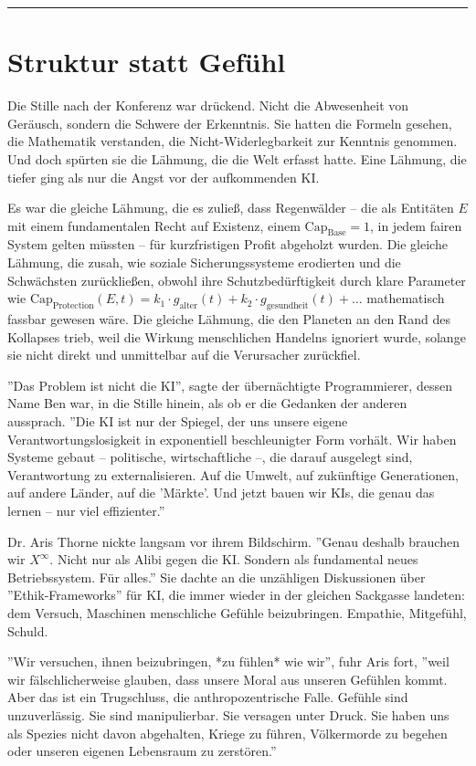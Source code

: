 \documentclass[12pt, ngerman, parskip=full]{scrartcl} %
\begin{document}
\noindent\rule{\linewidth}{0.4pt}



\section{Struktur statt Gefühl}
Die Stille nach der Konferenz war drückend. Nicht die Abwesenheit von Geräusch, sondern die Schwere der Erkenntnis. Sie hatten die Formeln gesehen, die Mathematik verstanden, die Nicht-Widerlegbarkeit zur Kenntnis genommen. Und doch spürten sie die Lähmung, die die Welt erfasst hatte. Eine Lähmung, die tiefer ging als nur die Angst vor der aufkommenden KI.

Es war die gleiche Lähmung, die es zuließ, dass Regenwälder – die als Entitäten $E$ mit einem fundamentalen Recht auf Existenz, einem $\text{Cap}_{\text{Base}} = 1$, in jedem fairen System gelten müssten – für kurzfristigen Profit abgeholzt wurden. Die gleiche Lähmung, die zusah, wie soziale Sicherungssysteme erodierten und die Schwächsten zurückließen, obwohl ihre Schutzbedürftigkeit durch klare Parameter wie $\text{Cap}_{\text{Protection}}(E, t) = k_1 \cdot g_{\text{alter}}(t) + k_2 \cdot g_{\text{gesundheit}}(t) + \dots$ mathematisch fassbar gewesen wäre. Die gleiche Lähmung, die den Planeten an den Rand des Kollapses trieb, weil die Wirkung menschlichen Handelns ignoriert wurde, solange sie nicht direkt und unmittelbar auf die Verursacher zurückfiel.

''Das Problem ist nicht die KI'', sagte der übernächtigte Programmierer, dessen Name Ben war, in die Stille hinein, als ob er die Gedanken der anderen aussprach. ''Die KI ist nur der Spiegel, der uns unsere eigene Verantwortungslosigkeit in exponentiell beschleunigter Form vorhält. Wir haben Systeme gebaut – politische, wirtschaftliche –, die darauf ausgelegt sind, Verantwortung zu externalisieren. Auf die Umwelt, auf zukünftige Generationen, auf andere Länder, auf die 'Märkte'. Und jetzt bauen wir KIs, die genau das lernen – nur viel effizienter.''

Dr. Aris Thorne nickte langsam vor ihrem Bildschirm. ''Genau deshalb brauchen wir $X^{\infty}$. Nicht nur als Alibi gegen die KI. Sondern als fundamental neues Betriebssystem. Für alles.'' Sie dachte an die unzähligen Diskussionen über ''Ethik-Frameworks'' für KI, die immer wieder in der gleichen Sackgasse landeten: dem Versuch, Maschinen menschliche Gefühle beizubringen. Empathie, Mitgefühl, Schuld.

''Wir versuchen, ihnen beizubringen, *zu fühlen* wie wir'', fuhr Aris fort, ''weil wir fälschlicherweise glauben, dass unsere Moral aus unseren Gefühlen kommt. Aber das ist ein Trugschluss, die anthropozentrische Falle. Gefühle sind unzuverlässig. Sie sind manipulierbar. Sie versagen unter Druck. Sie haben uns als Spezies nicht davon abgehalten, Kriege zu führen, Völkermorde zu begehen oder unseren eigenen Lebensraum zu zerstören.''
\end{document}
